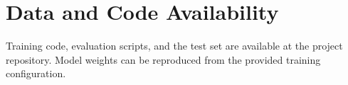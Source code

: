 \documentclass[12pt,a4paper]{article}
\begin{document}
\section*{Data and Code Availability}

Training code, evaluation scripts, and the test set are available
at the project repository. Model weights can be reproduced from the
provided training configuration.



\end{document}
